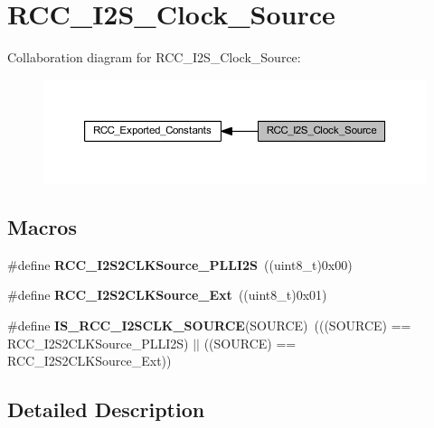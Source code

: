 \hypertarget{group___r_c_c___i2_s___clock___source}{}\section{R\+C\+C\+\_\+\+I2\+S\+\_\+\+Clock\+\_\+\+Source}
\label{group___r_c_c___i2_s___clock___source}
Collaboration diagram for R\+C\+C\+\_\+\+I2\+S\+\_\+\+Clock\+\_\+\+Source\+:\nopagebreak
\begin{figure}[H]
\begin{center}
\leavevmode
\includegraphics[width=350pt]{group___r_c_c___i2_s___clock___source}
\end{center}
\end{figure}
\subsection*{Macros}
\begin{DoxyCompactItemize}
\item 
\mbox{\label{group___r_c_c___i2_s___clock___source_gae26cc973323877114a509a0108d0a08a}} 
\#define {\bfseries R\+C\+C\+\_\+\+I2\+S2\+C\+L\+K\+Source\+\_\+\+P\+L\+L\+I2S}~((uint8\+\_\+t)0x00)
\item 
\mbox{\label{group___r_c_c___i2_s___clock___source_gaaed7a69a9f2c18645ef6aacd2135c750}} 
\#define {\bfseries R\+C\+C\+\_\+\+I2\+S2\+C\+L\+K\+Source\+\_\+\+Ext}~((uint8\+\_\+t)0x01)
\item 
\mbox{\label{group___r_c_c___i2_s___clock___source_gaa1bd931fa367969adeec7ba154ef7beb}} 
\#define {\bfseries I\+S\+\_\+\+R\+C\+C\+\_\+\+I2\+S\+C\+L\+K\+\_\+\+S\+O\+U\+R\+CE}(S\+O\+U\+R\+CE)~(((S\+O\+U\+R\+CE) == R\+C\+C\+\_\+\+I2\+S2\+C\+L\+K\+Source\+\_\+\+P\+L\+L\+I2S) $\vert$$\vert$ ((S\+O\+U\+R\+CE) == R\+C\+C\+\_\+\+I2\+S2\+C\+L\+K\+Source\+\_\+\+Ext))
\end{DoxyCompactItemize}


\subsection{Detailed Description}
